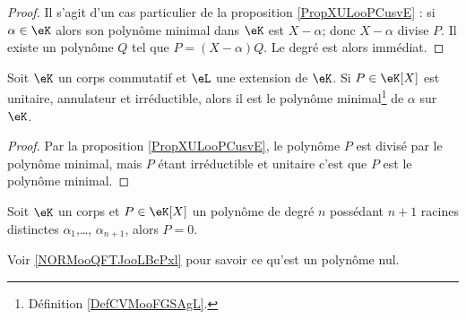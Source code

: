 \begin{proof}
    Il s'agit d'un cas particulier de la proposition \ref{PropXULooPCusvE} : si \( \alpha\in \eK\) alors son polynôme minimal dans \( \eK\) est \( X-\alpha\); donc \( X-\alpha\) divise \( P\). Il existe un polynôme \( Q\) tel que \( P=(X-\alpha)Q\). Le degré est alors immédiat.
\end{proof}

\begin{corollary}   \label{CorKZIooLPUjaf}
    Soit \( \eK\) un corps commutatif et \( \eL\) une extension de \( \eK\). Si \( P\in\eK[X]\) est unitaire, annulateur et irréductible, alors il est le polynôme minimal\footnote{Définition \ref{DefCVMooFGSAgL}.} de \( \alpha\) sur \( \eK\).
\end{corollary}

\begin{proof}
    Par la proposition \ref{PropXULooPCusvE}, le polynôme \( P\) est divisé par le polynôme minimal, mais \( P\) étant irréductible et unitaire c'est que \( P\) est le polynôme minimal.
\end{proof}

\begin{theorem}\label{ThoLXTooNaUAKR}
    Soit \( \eK\) un corps et \( P\in \eK[X]\) un polynôme de degré \( n\) possédant \( n+1\) racines distinctes \( \alpha_1\),\ldots, \( \alpha_{n+1}\), alors \( P=0\).
\end{theorem}
Voir \ref{NORMooQFTJooLBcPxl} pour savoir ce qu'est un polynôme nul.

